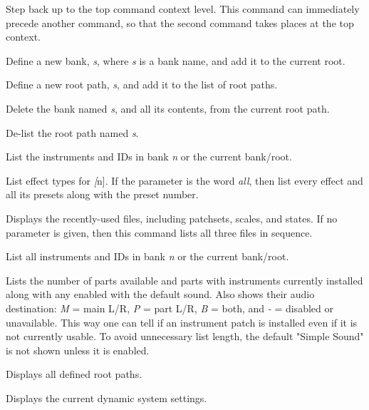       Step back up to the top command context level.
      This command can immediately precede another command, so that the second
      command takes places at the top context.

      Define a new bank, \textsl{s}, where \textsl{s} is a bank name,
      and add it to the current root.

      Define a new root path, \textsl{s}, and add it to the list of root paths.

      Delete the bank named \textsl{s}, and all its contents,
      from the current root path.

      De-list the root path named \textsl{s}.

      List the instruments and IDs in bank \textsl{n} or the
      current bank/root.

      List effect types for \textsl[n].
      If the parameter is the word \textsl{all},
      then list every effect and all its
      presets along with the preset number.

      Displays the recently-used files, including patchsets, scales, and
      states.  If no parameter is given, then this command lists all three
      files in sequence.

      List all instruments and IDs in bank \textsl{n}
      or the current bank/root.

      Lists the number of parts available and parts with instruments
      currently installed along with any enabled with the default sound.
      Also shows their audio destination:
      \textsl{M} = main L/R, \textsl{P} = part L/R, \textsl{B} = both, and
      \textsl{-} = disabled or unavailable.
      This way one can tell if an instrument patch is installed even if it is
      not currently usable.
      To avoid unnecessary list length, the default "Simple Sound" is not shown
      unless it is enabled.

      Displays all defined root paths.

      Displays the current dynamic system settings.

